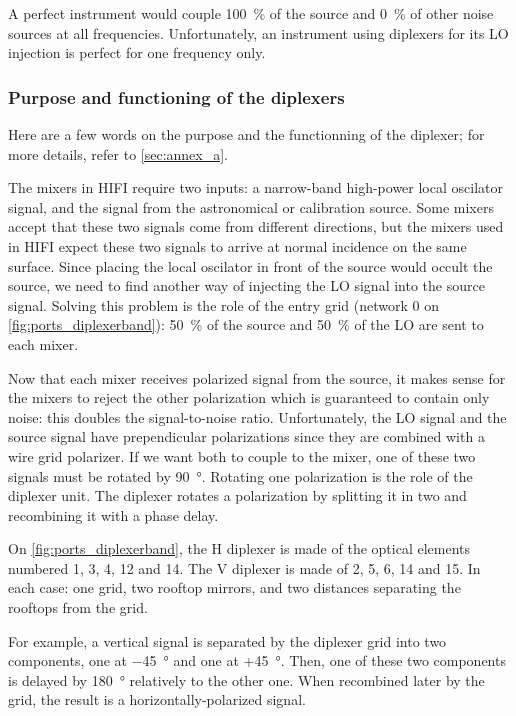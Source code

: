 A perfect instrument would couple \SI{100}{\percent} of the source and \SI{0}{\percent} of other noise sources at all frequencies.
Unfortunately, an instrument using diplexers for its LO injection is perfect for one frequency only.

\subsubsection{Purpose and functioning of the diplexers}
Here are a few words on the purpose and the functionning of the diplexer; for more details, refer to \cref{sec:annex_a}.

The mixers in HIFI require two inputs: a narrow-band high-power local oscilator signal, and the signal from the astronomical or calibration source.
Some mixers accept that these two signals come from different directions, but the mixers used in HIFI expect these two signals to arrive at normal incidence on the same surface.
Since placing the local oscilator in front of the source would occult the source, we need to find another way of injecting the LO signal into the source signal.
Solving this problem is the role of the entry grid (network 0 on \cref{fig:ports_diplexerband}): \SI{50}{\percent} of the source and \SI{50}{\percent} of the LO are sent to each mixer.

Now that each mixer receives polarized signal from the source, it makes sense for the mixers to reject the other polarization which is guaranteed to contain only noise:
this doubles the signal-to-noise ratio.
Unfortunately, the LO signal and the source signal have prependicular polarizations since they are combined with a wire grid polarizer.
If we want both to couple to the mixer, one of these two signals must be rotated by \SI{90}{\degree}.
Rotating one polarization is the role of the diplexer unit.
The diplexer rotates a polarization by splitting it in two and recombining it with a phase delay.

On \cref{fig:ports_diplexerband}, the H diplexer is made of the optical elements numbered 1, 3, 4, 12 and 14.
The V diplexer is made of 2, 5, 6, 14 and 15.
In each case: one grid, two rooftop mirrors, and two distances separating the rooftops from the grid.

For example, a vertical signal is separated by the diplexer grid into two components, one at \SI{-45}{\degree} and one at +\SI{+45}{\degree}. %
Then, one of these two components is delayed by \SI{180}{\degree} relatively to the other one.
When recombined later by the grid, the result is a horizontally-polarized signal.

